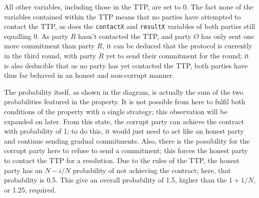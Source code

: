 \documentclass{l4proj}
\begin{document}
All other variables, including those in the TTP, are set to 0. The fact none of the variables contained within the TTP means that no parties have attempted to contact the TTP, as does the {\tt contactX} and {\tt resultX} variables of both parties still equalling 0. As party $R$ hasn't contacted the TTP, and party $O$ has only sent one more commitment than party $R$, it can be deduced that the protocol is currently in the third round, with party $R$ yet to send their commitment for the round; it is also deducible that as no party has yet contacted the TTP, both parties have thus far behaved in an honest and non-corrupt manner.

The probability itself, as shown in the diagram, is actually the sum of the two probabilities featured in the property. It is not possible from here to fulfil both conditions of the property with a single strategy; this observation will be expanded on later. From this state, the corrupt party can achieve the contract with probability of 1; to do this, it would just need to act like an honest party and continue sending gradual commitments. Also, there is the possibility for the corrupt party here to refuse to send a commitment; this forces the honest party to contact the TTP for a resolution. Due to the rules of the TTP, the honest party has an $N-i/N$ probability of not achieving the contract; here, that probability is 0.5. This give an overall probability of 1.5, higher than the $1+1/N$, or 1.25, required.
\end{document}
